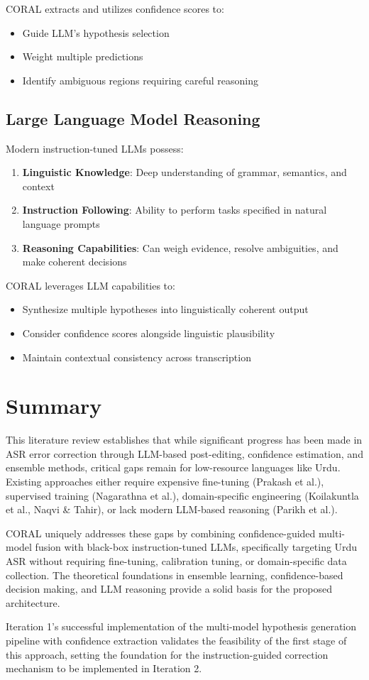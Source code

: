 CORAL extracts and utilizes confidence scores to:
\begin{itemize}
    \item Guide LLM's hypothesis selection
    \item Weight multiple predictions
    \item Identify ambiguous regions requiring careful reasoning
\end{itemize}

\subsection{Large Language Model Reasoning}

Modern instruction-tuned LLMs possess:

\begin{enumerate}
    \item \textbf{Linguistic Knowledge}: Deep understanding of grammar, semantics, and context
    \item \textbf{Instruction Following}: Ability to perform tasks specified in natural language prompts
    \item \textbf{Reasoning Capabilities}: Can weigh evidence, resolve ambiguities, and make coherent decisions
\end{enumerate}

CORAL leverages LLM capabilities to:
\begin{itemize}
    \item Synthesize multiple hypotheses into linguistically coherent output
    \item Consider confidence scores alongside linguistic plausibility
    \item Maintain contextual consistency across transcription
\end{itemize}

\section{Summary}

This literature review establishes that while significant progress has been made in ASR error correction through LLM-based post-editing, confidence estimation, and ensemble methods, critical gaps remain for low-resource languages like Urdu. Existing approaches either require expensive fine-tuning (Prakash et al.), supervised training (Nagarathna et al.), domain-specific engineering (Koilakuntla et al., Naqvi \& Tahir), or lack modern LLM-based reasoning (Parikh et al.).

CORAL uniquely addresses these gaps by combining confidence-guided multi-model fusion with black-box instruction-tuned LLMs, specifically targeting Urdu ASR without requiring fine-tuning, calibration tuning, or domain-specific data collection. The theoretical foundations in ensemble learning, confidence-based decision making, and LLM reasoning provide a solid basis for the proposed architecture.

Iteration 1's successful implementation of the multi-model hypothesis generation pipeline with confidence extraction validates the feasibility of the first stage of this approach, setting the foundation for the instruction-guided correction mechanism to be implemented in Iteration 2.